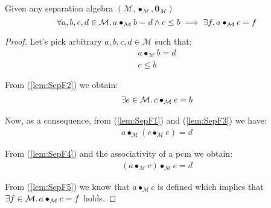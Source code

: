 \lem \label{lem:SepF} Given any separation algebra $(\mathcal{M}, \bullet_\mathcal{M}, \mathbf{0}_\mathcal{M})$
\[
	\forall a, b, c, d \in \mathcal{M} \ldotp a \bullet_\mathcal{M} b = d \land c \leq b \implies \exists f \ldotp a \bullet_\mathcal{M} c = f
\]

{\parindent0pt
\begin{proof}
Let's pick arbitrary $a, b, c, d \in \mathcal{M}$ such that:
\begin{gather}
	\label{lem:SepF1} a \bullet_\mathcal{M} b = d
	\\
	\label{lem:SepF2} c \leq b
\end{gather}

From (\ref{lem:SepF2}) we obtain:
\begin{gather}
	\label{lem:SepF3} \exists e \in \mathcal{M} \ldotp c \bullet_\mathcal{M} e = b
\end{gather}

Now, as a consequence, from (\ref{lem:SepF1}) and (\ref{lem:SepF3}) we have:
\begin{gather}
	\label{lem:SepF4} a \bullet_\mathcal{M} \left( c \bullet_\mathcal{M} e \right) = d
\end{gather}

From (\ref{lem:SepF4}) and the associativity of a pcm we obtain:
\begin{gather}
	\label{lem:SepF5} \left( a \bullet_\mathcal{M} c \right) \bullet_\mathcal{M} e = d
\end{gather}

From (\ref{lem:SepF5}) we know that $a \bullet_\mathcal{M} c$ is defined which implies that $\exists f \in \mathcal{M} \ldotp a \bullet_\mathcal{M} c = f$ holds.
\end{proof}
}

